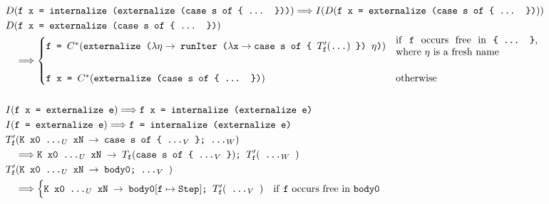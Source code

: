 \documentclass[sigplan,anonymous,review]{acmart}
\newcommand{\expr}[1]{(#1)} %
\newcommand{\rarr}{\rightarrow}
\newcommand{\rewrites}{\Longrightarrow}
\newcommand{\tdots}{\ttt{...}}
\newcommand{\exprdots}{\expr{\tdots}}
\newcommand{\ttt}{\texttt}
\newcommand{\showtodos}{}  %
\newenvironment{todo}
  {\ifthenelse{\isundefined{\showtodos}}{\comment}{\begin{tcolorbox}
    \textbf{TODO}:}}
  {\ifthenelse{\isundefined{\showtodos}}{\endcomment}{\end{tcolorbox}}
  }
\begin{document}
\clearpage



\begin{figure}[hp]
  \centering
\begin{align*}
  &D\expr{\ttt{f x = internalize (externalize (case s of \{ ... \}))}}
      \rewrites I(D(\ttt{f x = externalize (case s of \{ ... \})}))\\
  &D\expr{\ttt{f x = externalize (case s of \{ ... \})}}\\
      &\quad\rewrites \begin{cases}
        \ttt{f = $C^{*}\expr{\ttt{externalize ($\lambda \eta \rarr$ runIter ($\lambda \ttt{x} \rarr \ttt{case s of \{ $T'_{\ttt{f}}\exprdots$}$ \}) $\eta$)}}$} & \text{\parbox{5cm}{if \ttt{f} occurs free in \ttt{\{ ... \}}, where $\eta$ is a fresh name}}\\
        \\
        \ttt{f x = $C^{*}\expr{\ttt{externalize (case s of \{ ... \})}}$} & \text{otherwise}
      \end{cases}\\
  &\\
  &I\expr{\ttt{f x = externalize e}} \rewrites \ttt{f x = internalize (externalize e)}\\
  &I\expr{\ttt{f = externalize e}} \rewrites \ttt{f = internalize (externalize e)}\\
  &T'_{\ttt{f}}\expr{\ttt{K x0 ...$_U$ xN $\rarr$ case s of \{ ...$_V$ \}; ...$_W$}}\\
    &\quad\rewrites
        \ttt{K x0 ...$_U$ xN $\rarr$ $T_{\ttt{f}}\expr{\ttt{case s of \{ ...$_V$ \}}}$; $T'_{\ttt{f}}\expr{\ttt{ ...$_W$ }}$}\\
  &T'_{\ttt{f}}\expr{\ttt{K x0 ...$_U$ xN $\rarr$ body0; ...$_V$ }}\\
    &\quad\rewrites
      \begin{cases}
        \ttt{K x0 ...$_U$ xN $\rarr$ body0}[\ttt{f} \mapsto \ttt{Step}]\ttt{; }T'_{\ttt{f}}\expr{\ttt{ ...$_V$ }} & \text{if \ttt{f} occurs free in \ttt{body0}}\\

\end{cases}
\end{align*}
\end{figure}
\end{document}

